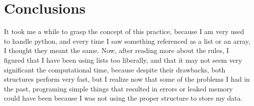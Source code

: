 \documentclass{article}
\begin{document}
\section{Conclusions}

It took me a while to grasp the concept of this practice, because I am very used to handle python, and every time I saw something referenced as a list or an array, I thought they meant the same. Now, after reading more about the rules, I figured that I have been using lists too liberally, and that it may not seem very significant the computational time, because despite their drawbacks, both structures perform very fast, but I realize now that some of the problems I had in the past, programing simple things that resulted in errors or leaked memory could have been because I was not using the proper structure to store my data.\\


 
\end{document}
